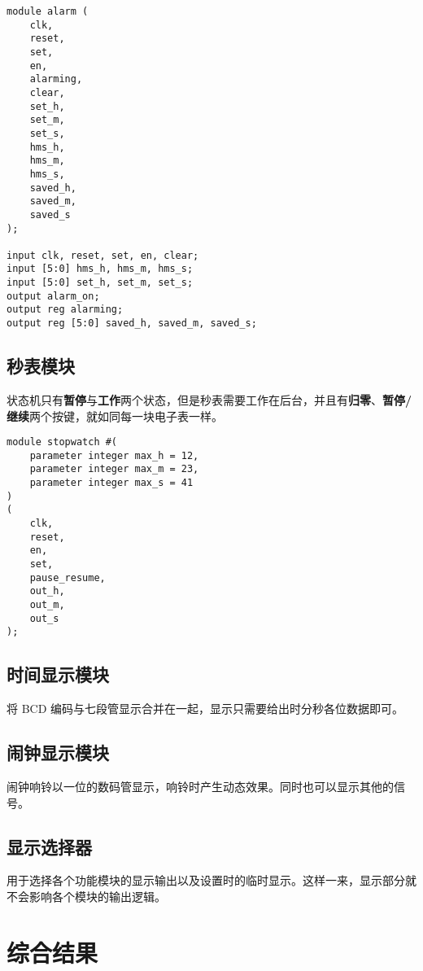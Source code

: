 \documentclass[lang=cn,11pt,a4paper,cite=authoryear]{elegantpaper}
\begin{document}
\begin{lstlisting}[caption={闹钟模块端口定义}]
module alarm (
    clk,
    reset,
    set,
    en,
    alarming,
    clear,
    set_h,
    set_m,
    set_s,
    hms_h,
    hms_m,
    hms_s,
    saved_h, 
    saved_m, 
    saved_s
);

input clk, reset, set, en, clear;
input [5:0] hms_h, hms_m, hms_s;
input [5:0] set_h, set_m, set_s;
output alarm_on;
output reg alarming;
output reg [5:0] saved_h, saved_m, saved_s;
\end{lstlisting}
    
\subsection{秒表模块}

状态机只有\textbf{暂停}与\textbf{工作}两个状态，但是秒表需要工作在后台，并且有\textbf{归零}、\textbf{暂停/继续}两个按键，就如同每一块电子表一样。


\begin{lstlisting}[caption={闹钟模块端口定义}]
module stopwatch #(
    parameter integer max_h = 12,
    parameter integer max_m = 23,
    parameter integer max_s = 41
) 
(
    clk,
    reset,
    en,
    set,
    pause_resume,
    out_h,
    out_m,
    out_s
);
\end{lstlisting}

\subsection{时间显示模块}

将 BCD 编码与七段管显示合并在一起，显示只需要给出时分秒各位数据即可。

\subsection{闹钟显示模块}

闹钟响铃以一位的数码管显示，响铃时产生动态效果。同时也可以显示其他的信号。

\subsection{显示选择器}

用于选择各个功能模块的显示输出以及设置时的临时显示。这样一来，显示部分就不会影响各个模块的输出逻辑。

\section{综合结果}
\end{document}
